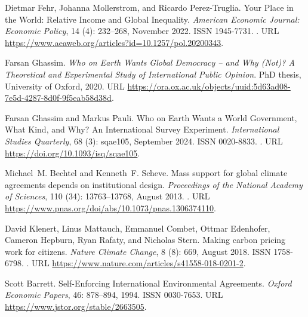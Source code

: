 \begin{thebibliography}{55}
  Dietmar Fehr, Johanna Mollerstrom, and Ricardo {Perez-Truglia}.
  \newblock Your {{Place}} in the {{World}}: {{Relative Income}} and {{Global
    Inequality}}.
  \newblock \emph{American Economic Journal: Economic Policy}, 14
    (4): 232--268, November 2022.
  \newblock ISSN 1945-7731.
  \newblock {}.
  \newblock URL \url{https://www.aeaweb.org/articles?id=10.1257/pol.20200343}.
  
  Farsan Ghassim.
  \newblock \emph{Who on Earth Wants Global Democracy -- and Why (Not)? {{A}}
    Theoretical and Experimental Study of International Public Opinion}.
  \newblock PhD thesis, University of Oxford, 2020.
  \newblock URL
    \url{https://ora.ox.ac.uk/objects/uuid:5d63ad08-7e5d-4287-8d0f-9f5eab58d38d}.
  
  Farsan Ghassim and Markus Pauli.
  \newblock Who on {{Earth Wants}} a {{World Government}}, {{What Kind}}, and
    {{Why}}? {{An International Survey Experiment}}.
  \newblock \emph{International Studies Quarterly}, 68 (3):
    sqae105, September 2024.
  \newblock ISSN 0020-8833.
  \newblock {}.
  \newblock URL \url{https://doi.org/10.1093/isq/sqae105}.
  
  Michael~M. Bechtel and Kenneth~F. Scheve.
  \newblock Mass support for global climate agreements depends on institutional
    design.
  \newblock \emph{Proceedings of the National Academy of Sciences}, 110
    (34): 13763--13768, August 2013.
  \newblock {}.
  \newblock URL \url{https://www.pnas.org/doi/abs/10.1073/pnas.1306374110}.
  
  David Klenert, Linus Mattauch, Emmanuel Combet, Ottmar Edenhofer, Cameron
    Hepburn, Ryan Rafaty, and Nicholas Stern.
  \newblock Making carbon pricing work for citizens.
  \newblock \emph{Nature Climate Change}, 8 (8): 669, August
    2018.
  \newblock ISSN 1758-6798.
  \newblock {}.
  \newblock URL \url{https://www.nature.com/articles/s41558-018-0201-2}.
  
  Scott Barrett.
  \newblock Self-{{Enforcing International Environmental Agreements}}.
  \newblock \emph{Oxford Economic Papers}, 46: 878--894, 1994.
  \newblock ISSN 0030-7653.
  \newblock URL \url{https://www.jstor.org/stable/2663505}.
  

\end{thebibliography}
